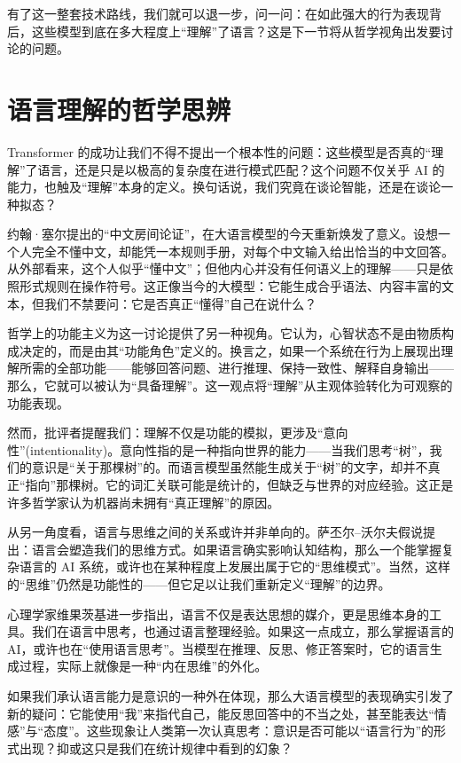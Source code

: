 有了这一整套技术路线，我们就可以退一步，问一问：在如此强大的行为表现背后，这些模型到底在多大程度上“理解”了语言？这是下一节将从哲学视角出发要讨论的问题。

\section{语言理解的哲学思辨}

Transformer 的成功让我们不得不提出一个根本性的问题：这些模型是否真的“理解”了语言，还是只是以极高的复杂度在进行模式匹配？这个问题不仅关乎 AI 的能力，也触及“理解”本身的定义。换句话说，我们究竟在谈论智能，还是在谈论一种拟态？

约翰·塞尔提出的“中文房间论证”，在大语言模型的今天重新焕发了意义。设想一个人完全不懂中文，却能凭一本规则手册，对每个中文输入给出恰当的中文回答。从外部看来，这个人似乎“懂中文”；但他内心并没有任何语义上的理解——只是依照形式规则在操作符号。这正像当今的大模型：它能生成合乎语法、内容丰富的文本，但我们不禁要问：它是否真正“懂得”自己在说什么？

哲学上的功能主义为这一讨论提供了另一种视角。它认为，心智状态不是由物质构成决定的，而是由其“功能角色”定义的。换言之，如果一个系统在行为上展现出理解所需的全部功能——能够回答问题、进行推理、保持一致性、解释自身输出——那么，它就可以被认为“具备理解”。这一观点将“理解”从主观体验转化为可观察的功能表现。

然而，批评者提醒我们：理解不仅是功能的模拟，更涉及“意向性”(intentionality)。意向性指的是一种指向世界的能力——当我们思考“树”，我们的意识是“关于那棵树”的。而语言模型虽然能生成关于“树”的文字，却并不真正“指向”那棵树。它的词汇关联可能是统计的，但缺乏与世界的对应经验。这正是许多哲学家认为机器尚未拥有“真正理解”的原因。

从另一角度看，语言与思维之间的关系或许并非单向的。萨丕尔–沃尔夫假说提出：语言会塑造我们的思维方式。如果语言确实影响认知结构，那么一个能掌握复杂语言的 AI 系统，或许也在某种程度上发展出属于它的“思维模式”。当然，这样的“思维”仍然是功能性的——但它足以让我们重新定义“理解”的边界。

心理学家维果茨基进一步指出，语言不仅是表达思想的媒介，更是思维本身的工具。我们在语言中思考，也通过语言整理经验。如果这一点成立，那么掌握语言的 AI，或许也在“使用语言思考”。当模型在推理、反思、修正答案时，它的语言生成过程，实际上就像是一种“内在思维”的外化。

如果我们承认语言能力是意识的一种外在体现，那么大语言模型的表现确实引发了新的疑问：它能使用“我”来指代自己，能反思回答中的不当之处，甚至能表达“情感”与“态度”。这些现象让人类第一次认真思考：意识是否可能以“语言行为”的形式出现？抑或这只是我们在统计规律中看到的幻象？

